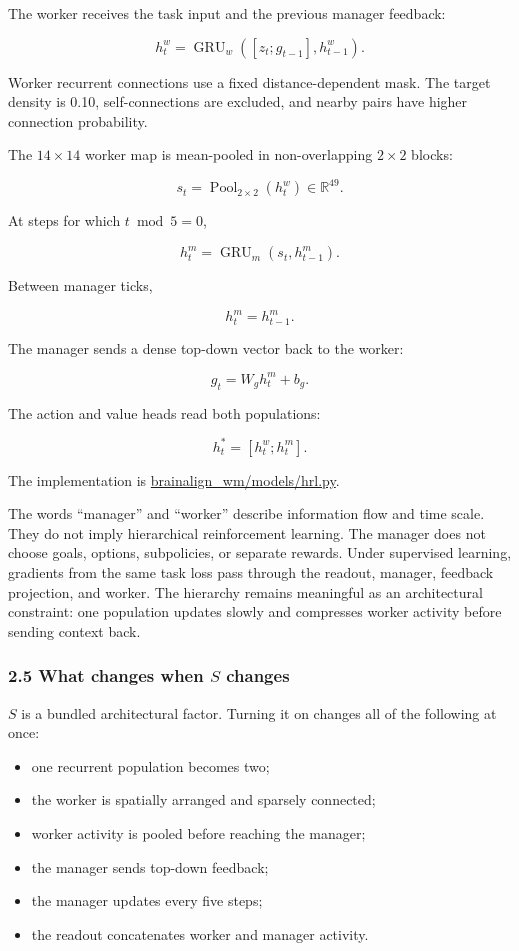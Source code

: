 \documentclass[
  10pt,
]{article}
\providecommand{\tightlist}{%
  \setlength{\itemsep}{0pt}\setlength{\parskip}{0pt}}
\begin{document}
The worker receives the task input and the previous manager feedback:

\[
h_t^w
=
\operatorname{GRU}_w
\left(
[z_t;g_{t-1}],h_{t-1}^w
\right).
\]

Worker recurrent connections use a fixed distance-dependent mask. The
target density is 0.10, self-connections are excluded, and nearby pairs
have higher connection probability.

The \(14\times14\) worker map is mean-pooled in non-overlapping
\(2\times2\) blocks:

\[
s_t=\operatorname{Pool}_{2\times2}(h_t^w)\in\mathbb{R}^{49}.
\]

At steps for which \(t\bmod5=0\),

\[
h_t^m=\operatorname{GRU}_m(s_t,h_{t-1}^m).
\]

Between manager ticks,

\[
h_t^m=h_{t-1}^m.
\]

The manager sends a dense top-down vector back to the worker:

\[
g_t=W_gh_t^m+b_g.
\]

The action and value heads read both populations:

\[
h_t^\ast=[h_t^w;h_t^m].
\]

The implementation is \url{brainalign_wm/models/hrl.py}.

The words ``manager'' and ``worker'' describe information flow and time
scale. They do not imply hierarchical reinforcement learning. The
manager does not choose goals, options, subpolicies, or separate
rewards. Under supervised learning, gradients from the same task loss
pass through the readout, manager, feedback projection, and worker. The
hierarchy remains meaningful as an architectural constraint: one
population updates slowly and compresses worker activity before sending
context back.

\hypertarget{what-changes-when-s-changes}{%
\subsubsection{\texorpdfstring{2.5 What changes when \(S\)
changes}{2.5 What changes when S changes}}\label{what-changes-when-s-changes}}

\(S\) is a bundled architectural factor. Turning it on changes all of
the following at once:

\begin{itemize}
\tightlist
\item
  one recurrent population becomes two;
\item
  the worker is spatially arranged and sparsely connected;
\item
  worker activity is pooled before reaching the manager;
\item
  the manager sends top-down feedback;
\item
  the manager updates every five steps;
\item
  the readout concatenates worker and manager activity.
\end{itemize}
\end{document}
